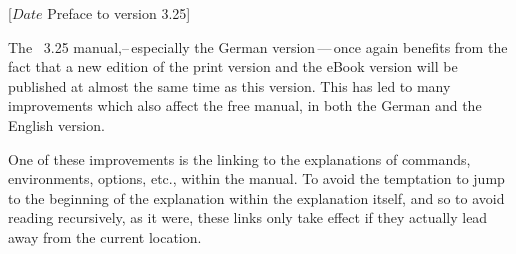 %
%
%
%
%
%
%
%
%

                 [$Date$
                  Preface to version 3.25]



The \KOMAScript~3.25 manual,\---\,especially the German version\,---\,once
again benefits from the fact that a new edition of the print version
\cite{book:komascript} and the eBook version \cite{ebook:komascript} will be
published at almost the same time as this version. This has led to many
improvements which also affect the free manual, in both the German and the
English version.

One of these improvements is the linking to the explanations of commands,
environments, options, etc., within the manual. To avoid the temptation to
jump to the beginning of the explanation within the explanation itself, and
so to avoid reading recursively, as it were, these links only take effect
if they actually lead away from the current location.

